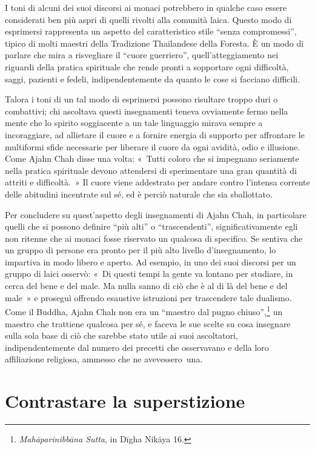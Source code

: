 I toni di alcuni dei suoi discorsi ai monaci potrebbero in qualche caso
essere considerati ben più aspri di quelli rivolti alla comunità laica.
Questo modo di esprimersi rappresenta un aspetto del caratteristico
stile ``senza compromessi'', tipico di molti maestri della Tradizione
Thailandese della Foresta. È un modo di parlare che mira a risvegliare
il ``cuore guerriero'', quell'atteggiamento nei riguardi della pratica
spirituale che rende pronti a sopportare ogni difficoltà, saggi,
pazienti e fedeli, indipendentemente da quanto le cose si facciano
difficili.

Talora i toni di un tal modo di esprimersi possono risultare troppo duri
o combattivi; chi ascoltava questi insegnamenti teneva ovviamente fermo
nella mente che lo spirito soggiacente a un tale linguaggio mirava
sempre a incoraggiare, ad allietare il cuore e a fornire energia di
supporto per affrontare le multiformi sfide necessarie per liberare il
cuore da ogni avidità, odio e illusione. Come Ajahn Chah disse una
volta: «~Tutti coloro che si impegnano seriamente nella pratica
spirituale devono attendersi di sperimentare una gran quantità di
attriti e difficoltà.~» Il cuore viene addestrato per andare contro
l'intensa corrente delle abitudini incentrate sul sé, ed è perciò
naturale che sia sballottato.

Per concludere su quest'aspetto degli insegnamenti di Ajahn Chah, in
particolare quelli che si possono definire ``più alti'' o
``trascendenti'', significativamente egli non ritenne che ai monaci
fosse riservato un qualcosa di specifico. Se sentiva che un gruppo di
persone era pronto per il più alto livello d'insegnamento, lo impartiva
in modo libero e aperto. Ad esempio, in uno dei suoi discorsi per un
gruppo di laici osservò: «~Di questi tempi la gente va lontano per
studiare, in cerca del bene e del male. Ma nulla sanno di ciò che è al
di là del bene e del male~» e proseguì offrendo esaustive istruzioni per
trascendere tale dualismo. Come il Buddha, Ajahn Chah non era un
``maestro dal pugno chiuso'',\footnote{\emph{Mahāparinibbāna Sutta}, in
  Dīgha Nikāya 16.} un maestro che trattiene qualcosa per sé, e
faceva le sue scelte su cosa insegnare sulla sola base di ciò che
sarebbe stato utile ai suoi ascoltatori, indipendentemente dal numero
dei precetti che osservavano e della loro affiliazione religiosa,
ammesso che ne avevessero~una.

\section{Contrastare la superstizione}

